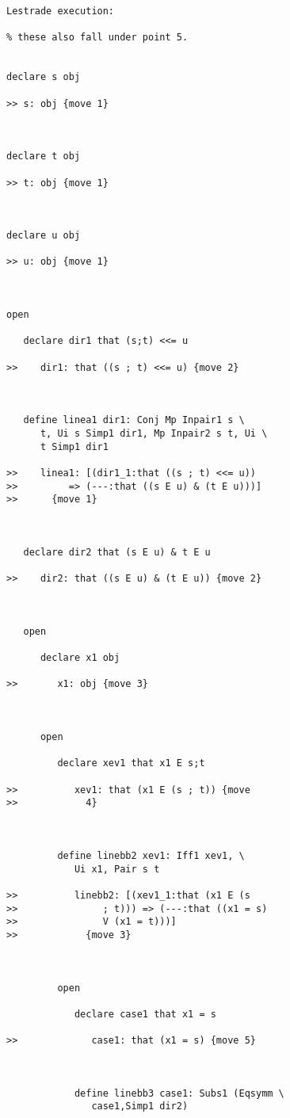\documentclass[12pt]{article}
\begin{document}
\begin{verbatim}Lestrade execution:

% these also fall under point 5.


declare s obj

>> s: obj {move 1}



declare t obj

>> t: obj {move 1}



declare u obj

>> u: obj {move 1}



open

   declare dir1 that (s;t) <<= u

>>    dir1: that ((s ; t) <<= u) {move 2}



   define linea1 dir1: Conj Mp Inpair1 s \
      t, Ui s Simp1 dir1, Mp Inpair2 s t, Ui \
      t Simp1 dir1

>>    linea1: [(dir1_1:that ((s ; t) <<= u))
>>         => (---:that ((s E u) & (t E u)))]
>>      {move 1}



   declare dir2 that (s E u) & t E u

>>    dir2: that ((s E u) & (t E u)) {move 2}



   open

      declare x1 obj

>>       x1: obj {move 3}



      open

         declare xev1 that x1 E s;t

>>          xev1: that (x1 E (s ; t)) {move
>>            4}



         define linebb2 xev1: Iff1 xev1, \
            Ui x1, Pair s t

>>          linebb2: [(xev1_1:that (x1 E (s
>>               ; t))) => (---:that ((x1 = s)
>>               V (x1 = t)))]
>>            {move 3}



         open

            declare case1 that x1 = s

>>             case1: that (x1 = s) {move 5}



            define linebb3 case1: Subs1 (Eqsymm \
               case1,Simp1 dir2)


\end{verbatim}
\end{document}
